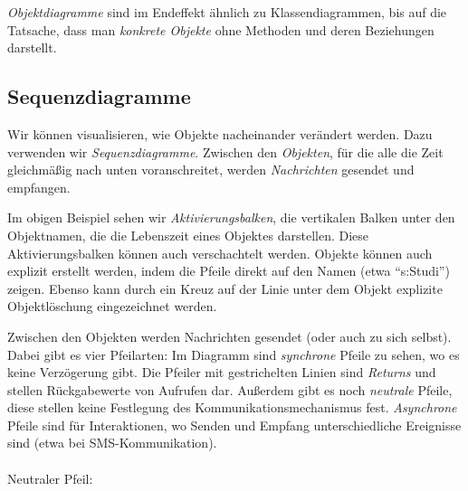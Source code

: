 \documentclass{panikzettel}
\begin{document}
\emph{Objektdiagramme} sind im Endeffekt ähnlich zu Klassendiagrammen, bis auf die Tatsache, dass man \emph{konkrete Objekte} ohne Methoden und deren Beziehungen darstellt.

\subsection{Sequenzdiagramme}
\label{sec:sequenzdiagramme}

Wir können visualisieren, wie Objekte nacheinander verändert werden.
Dazu verwenden wir \emph{Sequenzdiagramme}.
Zwischen den \emph{Objekten}, für die alle die Zeit gleichmäßig nach unten voranschreitet, werden \emph{Nachrichten} gesendet und empfangen.


Im obigen Beispiel sehen wir \emph{Aktivierungsbalken}, die vertikalen Balken unter den Objektnamen, die die Lebenszeit eines Objektes darstellen.
Diese Aktivierungsbalken können auch verschachtelt werden.
Objekte können auch explizit erstellt werden, indem die Pfeile direkt auf den Namen (etwa ``s:Studi'') zeigen.
Ebenso kann durch ein Kreuz auf der Linie unter dem Objekt explizite Objektlöschung eingezeichnet werden.

Zwischen den Objekten werden Nachrichten gesendet (oder auch zu sich selbst).
Dabei gibt es vier Pfeilarten: Im Diagramm sind \emph{synchrone} Pfeile zu sehen, wo es keine Verzögerung gibt.
Die Pfeiler mit gestrichelten Linien sind \emph{Returns} und stellen Rückgabewerte von Aufrufen dar.
Außerdem gibt es noch \emph{neutrale} Pfeile, diese stellen keine Festlegung des Kommunikationsmechanismus fest.
\emph{Asynchrone} Pfeile sind für Interaktionen, wo Senden und Empfang unterschiedliche Ereignisse sind (etwa bei SMS-Kommunikation).
~\\~\\
Neutraler Pfeil: 
\end{document}
